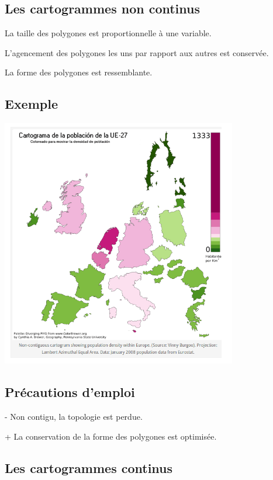 \documentclass[]{book}
\begin{document}
\hypertarget{les-cartogrammes-non-continus}{%
\subsection{Les cartogrammes non continus}\label{les-cartogrammes-non-continus}}

La taille des polygones est proportionnelle à une variable.

L'agencement des polygones les uns par rapport aux autres est conservée.

La forme des polygones est ressemblante.

\hypertarget{exemple-1}{%
\subsection{Exemple}\label{exemple-1}}

\includegraphics{img/nc.png}

\hypertarget{precautions-demploi-1}{%
\subsection{Précautions d'emploi}\label{precautions-demploi-1}}

- Non contigu, la topologie est perdue.

+ La conservation de la forme des polygones est optimisée.

\hypertarget{les-cartogrammes-continus}{%
\subsection{Les cartogrammes continus}\label{les-cartogrammes-continus}}
\end{document}
